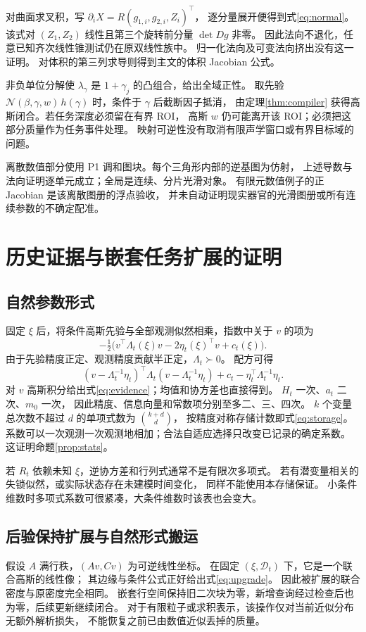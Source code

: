 \documentclass[11pt,a4paper]{article}
\numberwithin{equation}{section}
\theoremstyle{definition}
\newcommand{\N}{\mathcal N}
\newcommand{\D}{\mathcal D}
\begin{document}
对曲面求叉积，写 \(\partial_i X=R(g_{1,i},g_{2,i},Z_i)^\top\)，
逐分量展开便得到式\eqref{eq:normal}。
该式对 \((Z_1,Z_2)\) 线性且第三个旋转前分量 \(\det Dg\) 非零。
因此法向不退化，任意已知齐次线性锥测试仍在原双线性族中。
归一化法向及可变法向挤出没有这一证明。
对体积的第三列求导则得到主文的体积 Jacobian 公式。

非负单位分解使 \(\lambda_\gamma\) 是 \(1+\gamma_j\) 的凸组合，给出全域正性。
取先验 \(\N(\beta,\gamma,w)\,h(\gamma)\) 时，条件于 \(\gamma\) 后截断因子抵消，
由定理\ref{thm:compiler} 获得高斯闭合。若任务深度必须留在有界 ROI，
高斯 \(w\) 仍可能离开该 ROI；必须把这部分质量作为任务事件处理。
映射可逆性没有取消有限声学窗口或有界目标域的问题。

离散数值部分使用 P1 调和图块。每个三角形内部的逆基图为仿射，
上述导数与法向证明逐单元成立；全局是连续、分片光滑对象。
有限元数值例子的正 Jacobian 是该离散图册的浮点验收，
并未自动证明现实器官的光滑图册或所有连续参数的不确定配准。

\section{历史证据与嵌套任务扩展的证明}
\label{app:evidence}

\subsection{自然参数形式}
固定 \(\xi\) 后，将条件高斯先验与全部观测似然相乘，指数中关于 \(v\) 的项为
\[
 -\tfrac12\bigl(v^\top\Lambda_t(\xi)v-2\eta_t(\xi)^\top v+c_t(\xi)\bigr).
\]
由于先验精度正定、观测精度贡献半正定，\(\Lambda_t\succ0\)。
配方可得
\[
 (v-\Lambda_t^{-1}\eta_t)^\top\Lambda_t
 (v-\Lambda_t^{-1}\eta_t)+c_t-\eta_t^\top\Lambda_t^{-1}\eta_t.
\]
对 \(v\) 高斯积分给出式\eqref{eq:evidence}；均值和协方差也直接得到。
\(H_t\) 一次、\(a_t\) 二次、\(m_0\) 一次，
因此精度、信息向量和常数项分别至多二、三、四次。
\(k\) 个变量总次数不超过 \(d\) 的单项式数为 \(\binom{k+d}{d}\)，
按精度对称存储计数即式\eqref{eq:storage}。
系数可以一次观测一次观测地相加；合法自适应选择只改变已记录的确定系数。
这证明命题\ref{prop:stats}。

若 \(R_t\) 依赖未知 \(\xi\)，逆协方差和行列式通常不是有限次多项式。
若有潜变量相关的失锁似然，或实际状态存在未建模时间变化，
同样不能使用本存储保证。
小条件维数时多项式系数可很紧凑，大条件维数时该表也会变大。

\subsection{后验保持扩展与自然形式搬运}
假设 \(A\) 满行秩，\((Av,Cv)\) 为可逆线性坐标。
在固定 \((\xi,\D_t)\) 下，它是一个联合高斯的线性像；
其边缘与条件公式正好给出式\eqref{eq:upgrade}。
因此被扩展的联合密度与原密度完全相同。
嵌套行空间保持旧二次块为零，新增查询经过检查后也为零，后续更新继续闭合。
对于有限粒子或求积表示，该操作仅对当前近似分布无额外解析损失，
不能恢复之前已由数值近似丢掉的质量。
\end{document}
